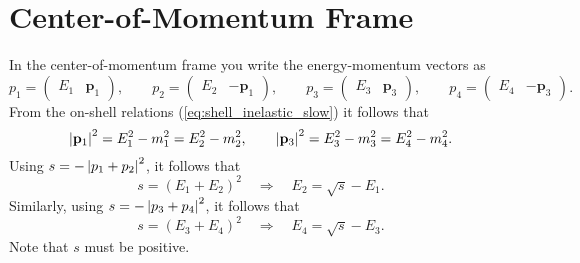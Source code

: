 \section{Center-of-Momentum Frame}
In the center-of-momentum frame you write the energy-momentum vectors as
\begin{equation}
	p_{1} = \begin{pmatrix} E_{1} & \mathbf{p}_{1} \end{pmatrix}, \qquad p_{2} = \begin{pmatrix} E_{2} & -\mathbf{p}_{1} \end{pmatrix}, \qquad p_{3} = \begin{pmatrix} E_{3} & \mathbf{p}_{3} \end{pmatrix}, \qquad p_{4} = \begin{pmatrix} E_{4} & -\mathbf{p}_{3} \end{pmatrix}.
\end{equation}
From the on-shell relations (\ref{eq:shell_inelastic_slow}) it follows that
\begin{equation}
	\left\lvert \mathbf{p}_{1} \right\rvert^{2} = E_{1}^{2} - m_{1}^{2} = E_{2}^{2} - m_{2}^{2}, \qquad \left\lvert \mathbf{p}_{3} \right\rvert^{2} = E_{3}^{2} - m_{3}^{2} = E_{4}^{2} - m_{4}^{2}.
\end{equation}
Using $s = -\left\lvert p_{1} + p_{2} \right\rvert^{2}$, it follows that
\begin{equation}
	s = \left( E_{1} + E_{2} \right)^{2} \quad \Longrightarrow \quad E_{2} = \sqrt{s} - E_{1}.
\end{equation}
Similarly, using $s = -\left\lvert p_{3} + p_{4} \right\rvert^{2}$, it follows that
\begin{equation}
	s = \left( E_{3} + E_{4} \right)^{2} \quad \Longrightarrow \quad E_{4} = \sqrt{s} - E_{3}.
\end{equation}
Note that $s$ must be positive.

